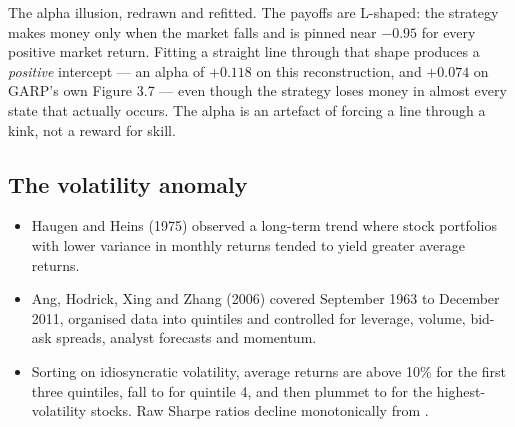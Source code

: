 %
{The alpha illusion, redrawn and refitted. The payoffs are L-shaped: the strategy
makes money only when the market falls and is pinned near $-0.95$ for every
positive market return. Fitting a straight line through that shape produces a
\emph{positive} intercept --- an alpha of $+0.118$ on this reconstruction, and
$+0.074$ on GARP's own Figure 3.7 --- even though the strategy loses money in
almost every state that actually occurs. The alpha is an artefact of forcing a
line through a kink, not a reward for skill.}


\subsection{The volatility anomaly}

\begin{itemize}
\item Haugen and Heins (1975) observed a long-term trend where stock portfolios
with lower variance in monthly returns tended to yield greater average returns.
\item Ang, Hodrick, Xing and Zhang (2006) covered September 1963 to December 2011,
organised data into quintiles and controlled for leverage, volume, bid-ask
spreads, analyst forecasts and momentum.
\item Sorting on idiosyncratic volatility, average returns are above 10\% for the
first three quintiles, fall to  for quintile 4, and then plummet to
 for the highest-volatility stocks. Raw Sharpe ratios decline
monotonically from .
\end{itemize}

